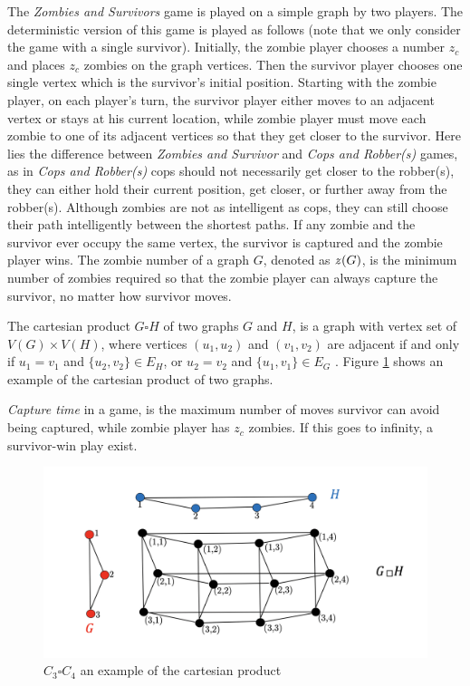 \documentclass[1p]{elsarticle}
\newcommand{\zn}{\ooalign{$z$\cr\hfil\rule[.5ex]{.2em}{.08ex}\hfil\cr}}
\begin{document}
The {\it Zombies and Survivors} game is played on a simple graph by two players. The deterministic version of this game
\cite{Fitz16} is played as follows (note that we only consider the game with a single survivor). Initially, the zombie
player chooses a number $z_c$ and places $z_c$ zombies on the graph vertices. Then the survivor player chooses one
single vertex which is the survivor's initial position. Starting with the zombie player, on each player's turn, the
survivor player either moves to an adjacent vertex or stays at his current location, while zombie player must move each
zombie to one of its adjacent vertices so that they get closer to the survivor. Here lies the difference between {\it
Zombies and Survivor} and {\it Cops and Robber(s)} games, as in {\it Cops and Robber(s)} cops should not necessarily get
closer to the robber(s), they can either hold their current position, get closer, or further away from the robber(s).
Although zombies are not as intelligent as cops, they can still choose their path intelligently between the shortest
paths. If any zombie and the survivor ever occupy the same vertex, the survivor is captured and the zombie player wins.
The zombie number of a graph $G$, denoted as $\zn(G)$, is the minimum number of zombies required so that the zombie
player can always capture the survivor, no matter how survivor moves.

The cartesian product $G \square H$ of two graphs $G$ and $H$, is a graph with vertex set of $V(G) \times V(H)$, where
vertices $(u_1 , u_2)$ and $(v_1 , v_2)$ are adjacent if and only if $u_1 = v_1$ and $ \{ u_2 , v_2 \} \in E_{H} $, or
$u_2 = v_2$ and $ \{u_1 , v_1 \} \in E_{G}$ \cite{West02}. Figure \ref{fig:p2} shows an example of the cartesian product
of two graphs.

{\it Capture time} in a game, is the maximum number of moves survivor can avoid being captured, while zombie player has
$z_c$ zombies. If this goes to infinity, a survivor-win play exist.

\begin{figure}[h!]
	\centering
	\includegraphics[width=0.9\linewidth]{fig/CpWest.png}
	\caption{$C_3 \square C_4$ an example of the cartesian product}
	\label{fig:p2}
\end{figure}
\end{document}
